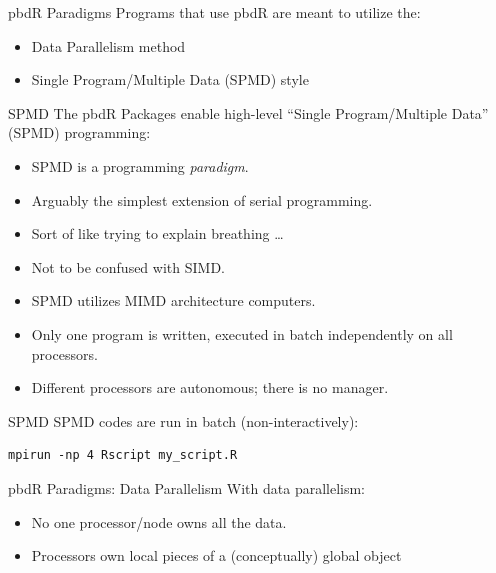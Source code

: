 \begin{frame}
  \begin{block}{pbdR Paradigms}
  Programs that use pbdR are meant to utilize the:
  \begin{itemize}[<+-|alert@+>]
   \item Data Parallelism method
   \item Single Program/Multiple Data (SPMD) style
  \end{itemize}
  \end{block}
\end{frame}



\begin{frame}
  \begin{block}{SPMD}\pause
  The pbdR Packages enable high-level ``Single Program/Multiple Data'' (SPMD) programming:
    \begin{itemize}
      \item SPMD is a programming \emph{paradigm}.
      \item Arguably the simplest extension of serial programming.
      \item Sort of like trying to explain breathing \dots
      \item Not to be confused with SIMD.
      \item SPMD utilizes MIMD architecture computers.
      \item Only one program is written, executed in batch independently on all processors.
      \item Different processors are autonomous; there is no manager.
    \end{itemize}
  \end{block}
\end{frame}


\begin{frame}[fragile]
  \begin{block}{SPMD}\pause
      SPMD codes are run in batch (non-interactively):
\begin{lstlisting}[backgroundcolor=\color{white},keywordstyle=\color{black},title=From the Shell]
mpirun -np 4 Rscript my_script.R
\end{lstlisting}
  \end{block}
\end{frame}


\begin{frame}
  \begin{block}{pbdR Paradigms:  Data Parallelism}
  With data parallelism:
  \begin{itemize}[<+-|alert@+>]
   \item No one processor/node owns all the data.
   \item Processors own local pieces of a (conceptually) global object
  \end{itemize}
  \end{block}
\end{frame}


